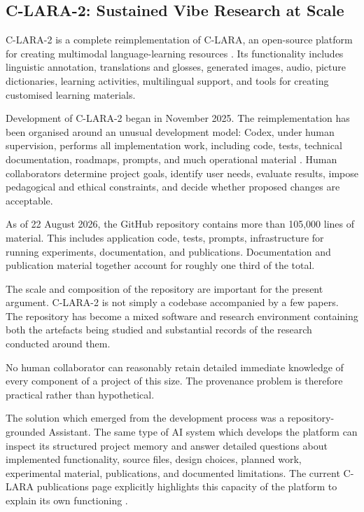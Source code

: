 \subsection{C-LARA-2: Sustained Vibe Research at Scale}

C-LARA-2 is a complete reimplementation of C-LARA, an open-source platform for creating multimodal language-learning resources \citep{claraOriginal}. Its functionality includes linguistic annotation, translations and glosses, generated images, audio, picture dictionaries, learning activities, multilingual support, and tools for creating customised learning materials.

Development of C-LARA-2 began in November 2025. The reimplementation has been organised around an unusual development model: Codex, under human supervision, performs all implementation work, including code, tests, technical documentation, roadmaps, prompts, and much operational material \citep{bediEtAl2026clara2}. Human collaborators determine project goals, identify user needs, evaluate results, impose pedagogical and ethical constraints, and decide whether proposed changes are acceptable.

As of 22 August 2026, the GitHub repository contains more than 105,000 lines of material. This includes application code, tests, prompts, infrastructure for running experiments, documentation, and publications. Documentation and publication material together account for roughly one third of the total.

The scale and composition of the repository are important for the present argument. C-LARA-2 is not simply a codebase accompanied by a few papers. The repository has become a mixed software and research environment containing both the artefacts being studied and substantial records of the research conducted around them.

No human collaborator can reasonably retain detailed immediate knowledge of every component of a project of this size. The provenance problem is therefore practical rather than hypothetical.

The solution which emerged from the development process was a repository-grounded Assistant. The same type of AI system which develops the platform can inspect its structured project memory and answer detailed questions about implemented functionality, source files, design choices, planned work, experimental material, publications, and documented limitations. The current C-LARA publications page explicitly highlights this capacity of the platform to explain its own functioning \citep{claradocuments2026}.

